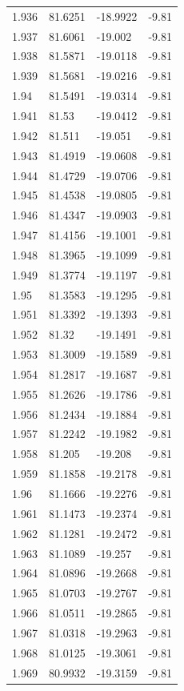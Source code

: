 \begin{tabular}{llll}
1.936 & 81.6251 & -18.9922 & -9.81 \\
1.937 & 81.6061 & -19.002 & -9.81 \\
1.938 & 81.5871 & -19.0118 & -9.81 \\
1.939 & 81.5681 & -19.0216 & -9.81 \\
1.94 & 81.5491 & -19.0314 & -9.81 \\
1.941 & 81.53 & -19.0412 & -9.81 \\
1.942 & 81.511 & -19.051 & -9.81 \\
1.943 & 81.4919 & -19.0608 & -9.81 \\
1.944 & 81.4729 & -19.0706 & -9.81 \\
1.945 & 81.4538 & -19.0805 & -9.81 \\
1.946 & 81.4347 & -19.0903 & -9.81 \\
1.947 & 81.4156 & -19.1001 & -9.81 \\
1.948 & 81.3965 & -19.1099 & -9.81 \\
1.949 & 81.3774 & -19.1197 & -9.81 \\
1.95 & 81.3583 & -19.1295 & -9.81 \\
1.951 & 81.3392 & -19.1393 & -9.81 \\
1.952 & 81.32 & -19.1491 & -9.81 \\
1.953 & 81.3009 & -19.1589 & -9.81 \\
1.954 & 81.2817 & -19.1687 & -9.81 \\
1.955 & 81.2626 & -19.1786 & -9.81 \\
1.956 & 81.2434 & -19.1884 & -9.81 \\
1.957 & 81.2242 & -19.1982 & -9.81 \\
1.958 & 81.205 & -19.208 & -9.81 \\
1.959 & 81.1858 & -19.2178 & -9.81 \\
1.96 & 81.1666 & -19.2276 & -9.81 \\
1.961 & 81.1473 & -19.2374 & -9.81 \\
1.962 & 81.1281 & -19.2472 & -9.81 \\
1.963 & 81.1089 & -19.257 & -9.81 \\
1.964 & 81.0896 & -19.2668 & -9.81 \\
1.965 & 81.0703 & -19.2767 & -9.81 \\
1.966 & 81.0511 & -19.2865 & -9.81 \\
1.967 & 81.0318 & -19.2963 & -9.81 \\
1.968 & 81.0125 & -19.3061 & -9.81 \\
1.969 & 80.9932 & -19.3159 & -9.81 \\

\end{tabular}
